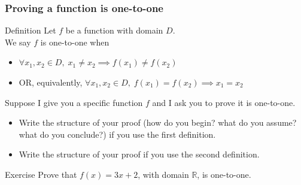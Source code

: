 \documentclass[14pt]{beamer}
\begin{document}
\begin{frame}
	\frametitle{Proving a function is one-to-one}
	\fontsize{13}{13}\selectfont

	\begin{block}{Definition}
		Let $f$ be a function with domain $D$. \\ We say $f$ is one-to-one when
		\begin{itemize}
			\item \hfill $\displaystyle \forall x_{1}, x_{2}\in D, \; x_{1}\neq x_{2}\implies
				f(x_{1}) \neq f(x_{2})$

			\item OR, equivalently, \hfill $\displaystyle \forall x_{1}, x_{2}\in D, \;
				f(x_{1}) = f(x_{2}) \implies x_{1}= x_{2}$
		\end{itemize}
	\end{block}

	\vfill

	Suppose I give you a specific function $f$ and I ask you to prove it is one-to-one.
	\begin{itemize}
		\item Write the structure of your proof (how do you begin? what do you assume?
			what do you conclude?) if you use the first definition.

		\item Write the structure of your proof if you use the second definition.
	\end{itemize}

	\vfill

	\begin{block}{Exercise}
		Prove that $f(x) = 3x + 2$, with domain $\mathbb{R}$, is one-to-one.
	\end{block}
\end{frame}
\end{document}
